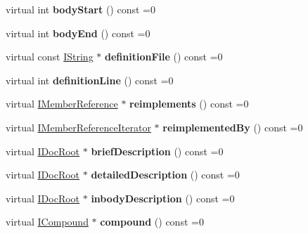 \begin{DoxyCompactItemize}
\mbox{\label{class_i_member_a2ce93188bc859187e86f8d428156c6f9}} 
virtual int {\bfseries body\+Start} () const =0
\item 
\mbox{\label{class_i_member_aac0f158429705055379c9fbe20238144}} 
virtual int {\bfseries body\+End} () const =0
\item 
\mbox{\label{class_i_member_acad5ba680a11d1e75cc90bed2b05b66e}} 
virtual const \mbox{\hyperlink{class_i_string}{I\+String}} $\ast$ {\bfseries definition\+File} () const =0
\item 
\mbox{\label{class_i_member_a69b4100409d9125c9af0569e058b5ca6}} 
virtual int {\bfseries definition\+Line} () const =0
\item 
\mbox{\label{class_i_member_a0469cb74868ede0532560cf11ea8b462}} 
virtual \mbox{\hyperlink{class_i_member_reference}{I\+Member\+Reference}} $\ast$ {\bfseries reimplements} () const =0
\item 
\mbox{\label{class_i_member_ab98947cc5e497846cd3f2e610baffff8}} 
virtual \mbox{\hyperlink{class_i_member_reference_iterator}{I\+Member\+Reference\+Iterator}} $\ast$ {\bfseries reimplemented\+By} () const =0
\item 
\mbox{\label{class_i_member_a51e22cf0dbb09bddb5a31e652cc297b3}} 
virtual \mbox{\hyperlink{class_i_doc_root}{I\+Doc\+Root}} $\ast$ {\bfseries brief\+Description} () const =0
\item 
\mbox{\label{class_i_member_a063a767b3e70c03760dbe6dc254b6c38}} 
virtual \mbox{\hyperlink{class_i_doc_root}{I\+Doc\+Root}} $\ast$ {\bfseries detailed\+Description} () const =0
\item 
\mbox{\label{class_i_member_a842140442b5379fe61b793a9cbef1b0e}} 
virtual \mbox{\hyperlink{class_i_doc_root}{I\+Doc\+Root}} $\ast$ {\bfseries inbody\+Description} () const =0
\item 
\mbox{\label{class_i_member_a17b671a723e1b5b0f022c05e11f91349}} 
virtual \mbox{\hyperlink{class_i_compound}{I\+Compound}} $\ast$ {\bfseries compound} () const =0

\end{DoxyCompactItemize}
